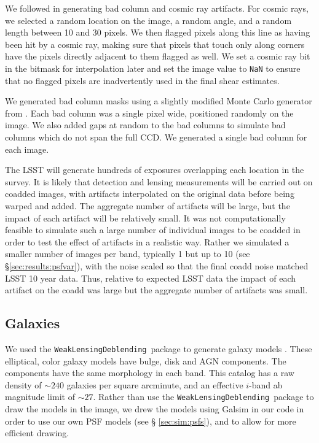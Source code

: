 \documentclass[twocolumn,twocolappendix,astrosym]{openjournal}
\newcommand{\descwl}{\texttt{WeakLensingDeblending}}
\begin{document}
We followed \citet{BeckerMdetCoadd} in generating bad column and
cosmic ray artifacts.  For cosmic rays, we selected a random location on the
image, a random angle, and a random length between 10 and 30 pixels. We then
flagged pixels along this line as having been hit by a cosmic ray, making sure
that pixels that touch only along corners have the pixels directly adjacent to
them flagged as well. We set a cosmic ray bit in the bitmask for interpolation
later and set the image value to \texttt{NaN} to ensure that no flagged pixels
are inadvertently used in the final shear estimates.

We generated bad column masks using a slightly modified Monte Carlo generator
from \citet{BeckerMdetCoadd}. Each bad column was a single pixel wide,
positioned randomly on the image. We also added gaps at random to the bad
columns to simulate bad columns which do not span the full CCD.  We generated
a single bad column for each image.

The LSST will generate hundreds of exposures overlapping each location in the
survey.  It is likely that detection and lensing measurements will be carried
out on coadded images, with artifacts interpolated on the original data before
being warped and added.  The aggregate number of artifacts will be large, but
the impact of each artifact will be relatively small.  It was not
computationally feasible to simulate such a large number of individual images
to be coadded in order to test the effect of artifacts in a realistic way.
Rather we simulated a smaller number of images per band, typically 1 but up to
10 (see \S \ref{sec:results:psfvar}), with the noise scaled so that the final
coadd noise matched LSST 10 year data.  Thus, relative to expected LSST data
the impact of each artifact on the coadd was large but the aggregate number of
artifacts was small.

\subsection{Galaxies} \label{sec:sim:galaxies}

We used the \descwl\ package to generate galaxy models
\citep{DESCWLSanchez2021}.  These elliptical, color galaxy models have bulge,
disk and AGN components.  The components have the same morphology in each band.
This catalog has a raw density of $\sim240$ galaxies per square arcminute, and
an effective $i$-band ab magnitude limit of $\sim27$.  Rather than use the
\descwl\ package to draw the models in the image, we drew the models using
Galsim in our code in order to use our own PSF models (see \S
\ref{sec:sim:psfs}), and to allow for more efficient drawing.
\end{document}
